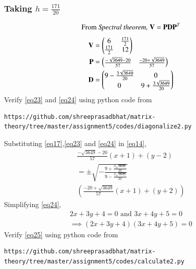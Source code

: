 \documentclass[journal,12pt,twocolumn]{IEEEtran}
\begin{document}
\subsubsection{Taking $h=\frac{171}{20}$}
\begin{equation}
	\text{From \textit{Spectral theorem, }} \vec{V} = \vec{P}\vec{D}\vec{P}^T
\end{equation}
\begin{align}
	\vec{V} &= \myvec{ 6 & \frac{171}{2}\\ \frac{171}{2} & 12}\\
	\label{eq23}\vec{P} &= \myvec{\frac{-\sqrt{3649} - 20}{57} & \frac{-20 + \sqrt{3649}}{57}}\\
	\label{eq24}\vec{D} &= \myvec{9 - \frac{3\sqrt{3649}}{20} & 0\\ 0 & 9 + \frac{3\sqrt{3649}}{20}}
\end{align}
Verify  \eqref{eq23} and \eqref{eq24} using python code from
\begin{lstlisting}
https://github.com/shreeprasadbhat/matrix-theory/tree/master/assignment5/codes/diagonalize2.py
\end{lstlisting}
Substituting \eqref{eq17},\eqref{eq23} and \eqref{eq24} in \eqref{eq14}, 
\begin{multline}\label{eq25}
	\frac{-\sqrt{3649} - 20}{57}(x+1) + (y-2) \\= \pm 
	\sqrt{-\frac{9 + \frac{3\sqrt{3649}}{20}}{9 - \frac{3\sqrt{3649}}{20}}}\\
	\left(\frac{-20 + \sqrt{3649}}{57}(x+1) + (y+2)\right)
\end{multline}
Simplifying \eqref{eq24},
\begin{align}
	\label{eq26}2x + 3y + 4 = 0 \text{ and } 3x + 4y + 5 = 0\\
	\label{eq27}\implies (2x + 3y + 4)(3x + 4y + 5) = 0
\end{align}
Verify  \eqref{eq25} using python code from
\begin{lstlisting}
https://github.com/shreeprasadbhat/matrix-theory/tree/master/assignment5/codes/calculate2.py
\end{lstlisting}
\renewcommand{\thefigure}{2}
\end{document}
